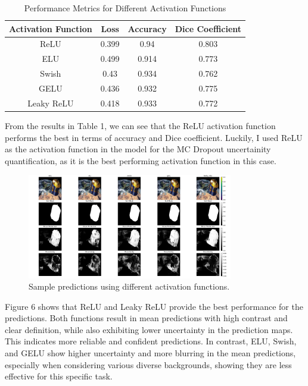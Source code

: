 \documentclass{article}
\begin{document}
\begin{table}[h!]
    \centering
    \begin{tabular}{|c|c|c|c|}
        \hline
        \textbf{Activation Function} & \textbf{Loss} & \textbf{Accuracy} & \textbf{Dice Coefficient} \\
        \hline
        ReLU & 0.399 & 0.94 & 0.803 \\
        \hline
        ELU & 0.499 & 0.914 & 0.773 \\
        \hline
        Swish & 0.43 & 0.934 & 0.762 \\
        \hline
        GELU & 0.436 & 0.932 & 0.775 \\
        \hline
        Leaky ReLU & 0.418 & 0.933 & 0.772 \\
        \hline
    \end{tabular}
    \caption{Performance Metrics for Different Activation Functions}
    \label{tab:activation_functions}
\end{table}

From the results in Table 1, we can see that the ReLU activation function performs the best in terms of accuracy and Dice coefficient.  
Luckily, I used ReLU as the activation function in the model for the MC Dropout uncertainity quantification, as it is 
the best performing activation function in this case.

\begin{figure}[h]
    \centering
    \includegraphics[width=0.8\textwidth]{../images/activation_funcs/activation_funcs_predictions.png}
    \caption{Sample predictions using different activation functions.}
    \label{fig:activation_functions_predictions}
\end{figure}
\vspace{1em}

Figure 6 shows that ReLU and Leaky ReLU provide the best performance for the predictions. Both functions result in mean 
predictions with high contrast and clear definition, while also exhibiting lower uncertainty in the prediction maps. 
This indicates more reliable and confident predictions. In contrast, ELU, 
Swish, and GELU show higher uncertainty and more blurring in the mean predictions, especially when considering various 
diverse backgrounds, showing they are less effective for this specific task.
\end{document}
